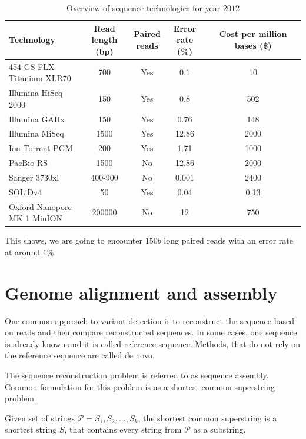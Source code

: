 \begin{table}[h]
\centering
\caption{Overview of sequence technologies for year $2012$}
\label{my-label}
\begin{tabular}{|l||c|c|c|c|}
\hline
Technology & \specialcell[c]{Read \\ length (bp)} & \specialcell[c]{Paired \\ reads }& \specialcell[c]{Error\\ rate (\%)} & \specialcell[c]{Cost per million\\bases (\$)} \\
\hline
\specialcell[l]{454 GS FLX \\Titanium XLR70 }& 700 & Yes & 0.1  &  10 \\
Illumina HiSeq 2000 & 150 & Yes & 0.8 & 502 \\
Illumina GAIIx & 150 & Yes & 0.76 & 148 \\
Illumina MiSeq & 1500 & Yes & 12.86 & 2000\\
Ion Torrent PGM & 200 & Yes & 1.71 & 1000\\
PacBio RS & 1500 & No & 12.86 & 2000\\
Sanger 3730xl & 400-900 & No & 0.001 & 2400\\
SOLiDv4 & 50 & Yes & 0.04 & 0.13\\
\specialcell[l]{Oxford Nanopore \\MK 1 MinION} & 200000 & No & 12 & 750\\
 
\hline
\end{tabular}
\end{table}

This shows, we are going to encounter $150b$ long paired reads with an error rate at around $1\%$.


\section{Genome alignment and assembly}
One common approach to variant detection is to reconstruct the sequence based on reads and then compare reconstructed sequences. 
In some cases, one sequence is already known and it is called reference sequence. 
Methods, that do not rely on the reference sequence are called de novo.

The sequence reconstruction problem is referred to as sequence assembly. 
Common formulation for this problem is as a shortest common superstring problem.
\begin{definicia} 
Given set of strings $\mathcal{P} = {S_1 , S_2 , . . . , S_k }$,
the shortest common superstring is a shortest string $S$, that contains every string from $\mathcal{P}$ as a substring. 
\end{definicia}

